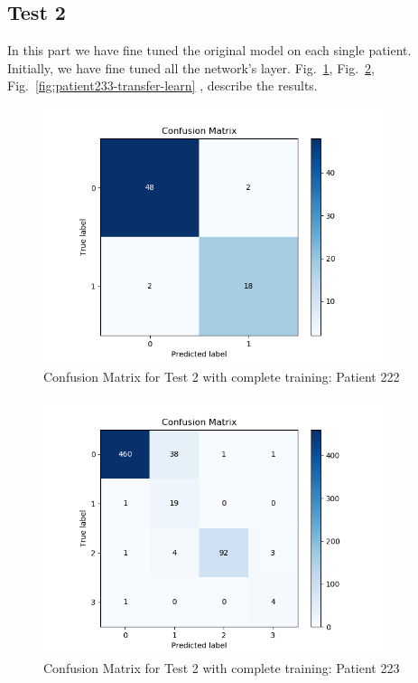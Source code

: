 \documentclass[LaM,binding=0.6cm]{sapthesis}
\begin{document}
\subsection{Test 2}
In this part we have fine tuned the original model on each single patient.\\Initially, we have fine tuned all the network's layer.
Fig.~\ref{fig:patient222-transfer-learn}, Fig.~\ref{fig:patient223-transfer-learn}, Fig.~\ref{fig:patient233-transfer-learn} , describe the results.
\begin{figure}[H]  \centering
	\includegraphics[width=100mm,scale=0.7]{patient222-transfer-learn}
	\caption{Confusion Matrix for Test 2 with complete training: Patient 222}
	\label{fig:patient222-transfer-learn}
\end{figure}
\begin{figure}[H]  \centering
	\includegraphics[width=100mm,scale=0.7]{patient223-transfer-learn}
	\caption{Confusion Matrix for Test 2 with complete training: Patient 223}
	\label{fig:patient223-transfer-learn}
\end{figure}
\end{document}
